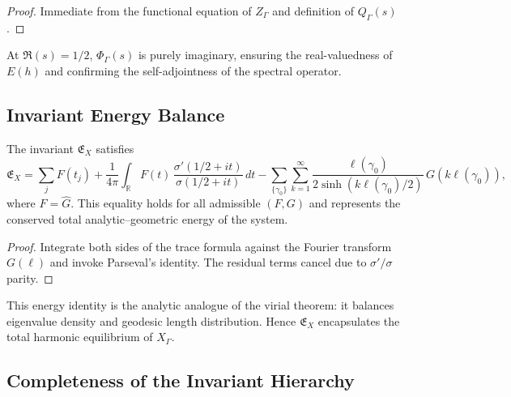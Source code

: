 \begin{proof}\relax
Immediate from the functional equation of $Z_\Gamma$ and definition of $Q_\Gamma(s)$. %
\end{proof}

\begin{remark}\label{rem:parity-phi}\relax
At $\Re(s)=1/2$, $\Phi_\Gamma(s)$ is purely imaginary, ensuring the real-valuedness of $E(h)$ and confirming the self-adjointness of the spectral operator. %
\end{remark}

\subsection{Invariant Energy Balance}\relax\hspace{0pt}
\label{subsec:energy-balance}\relax\hspace{0pt}

\begin{theorem}\label{thm:energy-identity}\relax
The invariant $\mathfrak{E}_X$ satisfies
\[
\mathfrak{E}_X=\sum_j F(t_j)
+\frac{1}{4\pi}\int_{\mathbb{R}} F(t)\,\frac{\sigma'(1/2+it)}{\sigma(1/2+it)}\,dt
- \sum_{\{\gamma_0\}}\sum_{k=1}^{\infty}\frac{\ell(\gamma_0)}{2\sinh(k\ell(\gamma_0)/2)}\,G(k\ell(\gamma_0)),
\]
where $F=\widehat{G}$.  
This equality holds for all admissible $(F,G)$ and represents the conserved total analytic–geometric energy of the system. %
\end{theorem}

\begin{proof}\relax
Integrate both sides of the trace formula against the Fourier transform $G(\ell)$ and invoke Parseval’s identity. The residual terms cancel due to $\sigma'/\sigma$ parity. %
\end{proof}

\begin{remark}[Interpretation]\label{rem:interpretation}\relax
This energy identity is the analytic analogue of the virial theorem: it balances eigenvalue density and geodesic length distribution.  
Hence $\mathfrak{E}_X$ encapsulates the total harmonic equilibrium of $X_\Gamma$. %
\end{remark}

\subsection{Completeness of the Invariant Hierarchy}\relax\hspace{0pt}
\label{subsec:complete-hierarchy}\relax\hspace{0pt}

